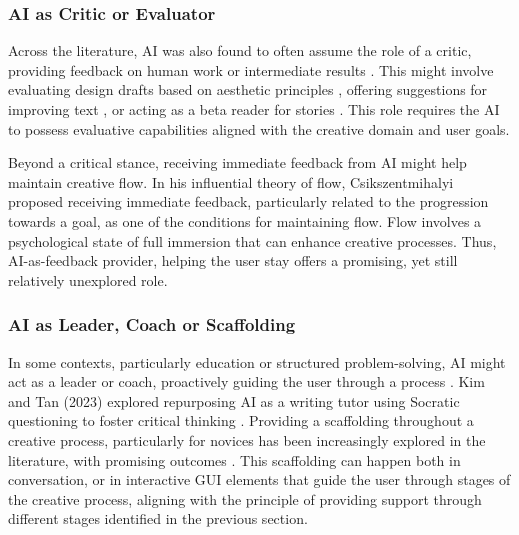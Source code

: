 \subsubsection{AI as Critic or Evaluator}
Across the literature, AI was also found to often assume the role of a critic, providing feedback on human work or intermediate results \cite{Lin2023-zq}. This might involve evaluating design drafts based on aesthetic principles \cite{Zhou2024-vp}, offering suggestions for improving text \cite{Chakrabarty2024-ov}, or acting as a beta reader for stories \cite{Ippolito2022-mf}. This role requires the AI to possess evaluative capabilities aligned with the creative domain and user goals.

Beyond a critical stance, receiving immediate feedback from AI might help maintain creative flow. In his influential theory of flow, Csikszentmihalyi \cite{Csikszentmihalyi1990-hu} proposed receiving immediate feedback, particularly related to the progression towards a goal, as one of the conditions for maintaining flow. Flow involves a psychological state of full immersion that can enhance creative processes. Thus, AI-as-feedback provider, helping the user stay offers a promising, yet still relatively unexplored role. 

\subsubsection{AI as Leader, Coach or Scaffolding}

In some contexts, particularly education or structured problem-solving, AI might act as a leader or coach, proactively guiding the user through a process \cite{Zhong2024-ij}. Kim and Tan (2023) explored repurposing AI as a writing tutor using Socratic questioning to foster critical thinking \cite{Kim2023-wt}. Providing a scaffolding throughout a creative process, particularly for novices has been increasingly explored in the literature, with promising outcomes \cite{Yuan2022-kb, Fan2019-qq, Ding2024-ta, Long2019-lw, Louie2020-aq, Ippolito2022-mf, Wadinambiarachchi2024-jn}. This scaffolding can happen both in conversation, or in interactive GUI elements that guide the user through stages of the creative process, aligning with the principle of providing support through different stages identified in the previous section. 

